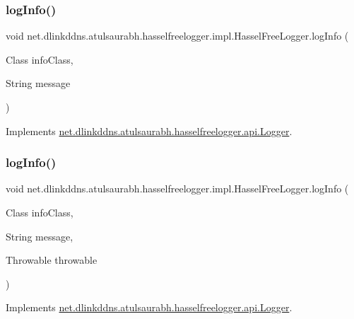 \subsubsection{\texorpdfstring{log\+Info()}{logInfo()}\hspace{0.1cm}{\footnotesize\ttfamily [2/3]}}
{\footnotesize\ttfamily void net.\+dlinkddns.\+atulsaurabh.\+hasselfreelogger.\+impl.\+Hassel\+Free\+Logger.\+log\+Info (\begin{DoxyParamCaption}\item[{Class}]{info\+Class,  }\item[{String}]{message }\end{DoxyParamCaption})}



Implements \mbox{\hyperlink{interfacenet_1_1dlinkddns_1_1atulsaurabh_1_1hasselfreelogger_1_1api_1_1_logger_ac0c7463bc249c77cd33e02b99a77a8d8}{net.\+dlinkddns.\+atulsaurabh.\+hasselfreelogger.\+api.\+Logger}}.

\mbox{\label{classnet_1_1dlinkddns_1_1atulsaurabh_1_1hasselfreelogger_1_1impl_1_1_hassel_free_logger_ac0596a92805b29d9402a9eb17c71891a}} 
\subsubsection{\texorpdfstring{log\+Info()}{logInfo()}\hspace{0.1cm}{\footnotesize\ttfamily [3/3]}}
{\footnotesize\ttfamily void net.\+dlinkddns.\+atulsaurabh.\+hasselfreelogger.\+impl.\+Hassel\+Free\+Logger.\+log\+Info (\begin{DoxyParamCaption}\item[{Class}]{info\+Class,  }\item[{String}]{message,  }\item[{Throwable}]{throwable }\end{DoxyParamCaption})}



Implements \mbox{\hyperlink{interfacenet_1_1dlinkddns_1_1atulsaurabh_1_1hasselfreelogger_1_1api_1_1_logger_a07cf4314c71f95135245d10dffc14d2f}{net.\+dlinkddns.\+atulsaurabh.\+hasselfreelogger.\+api.\+Logger}}.

